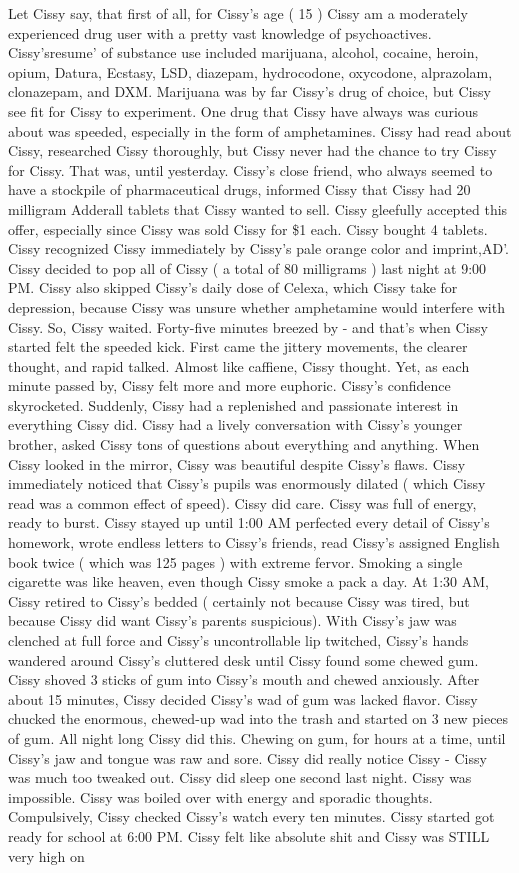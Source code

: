 \documentclass[12pt]{book}
\begin{document}
Let Cissy say, that first of all, for Cissy's age ( 15 ) Cissy am a moderately experienced drug user with a pretty vast knowledge of psychoactives. Cissy'sresume' of substance use included marijuana, alcohol, cocaine, heroin, opium, Datura, Ecstasy, LSD, diazepam, hydrocodone, oxycodone, alprazolam, clonazepam, and DXM. Marijuana was by far Cissy's drug of choice, but Cissy see fit for Cissy to experiment. One drug that Cissy have always was curious about was speeded, especially in the form of amphetamines. Cissy had read about Cissy, researched Cissy thoroughly, but Cissy never had the chance to try Cissy for Cissy. That was, until yesterday. Cissy's close friend, who always seemed to have a stockpile of pharmaceutical drugs, informed Cissy that Cissy had 20 milligram Adderall tablets that Cissy wanted to sell. Cissy gleefully accepted this offer, especially since Cissy was sold Cissy for \$1 each. Cissy bought 4 tablets. Cissy recognized Cissy immediately by Cissy's pale orange color and imprint,AD'. Cissy decided to pop all of Cissy ( a total of 80 milligrams ) last night at 9:00 PM. Cissy also skipped Cissy's daily dose of Celexa, which Cissy take for depression, because Cissy was unsure whether amphetamine would interfere with Cissy. So, Cissy waited. Forty-five minutes breezed by - and that's when Cissy started felt the speeded kick. First came the jittery movements, the clearer thought, and rapid talked. Almost like caffiene, Cissy thought. Yet, as each minute passed by, Cissy felt more and more euphoric. Cissy's confidence skyrocketed. Suddenly, Cissy had a replenished and passionate interest in everything Cissy did. Cissy had a lively conversation with Cissy's younger brother, asked Cissy tons of questions about everything and anything. When Cissy looked in the mirror, Cissy was beautiful despite Cissy's flaws. Cissy immediately noticed that Cissy's pupils was enormously dilated ( which Cissy read was a common effect of speed). Cissy did care. Cissy was full of energy, ready to burst. Cissy stayed up until 1:00 AM perfected every detail of Cissy's homework, wrote endless letters to Cissy's friends, read Cissy's assigned English book twice ( which was 125 pages ) with extreme fervor. Smoking a single cigarette was like heaven, even though Cissy smoke a pack a day. At 1:30 AM, Cissy retired to Cissy's bedded ( certainly not because Cissy was tired, but because Cissy did want Cissy's parents suspicious). With Cissy's jaw was clenched at full force and Cissy's uncontrollable lip twitched, Cissy's hands wandered around Cissy's cluttered desk until Cissy found some chewed gum. Cissy shoved 3 sticks of gum into Cissy's mouth and chewed anxiously. After about 15 minutes, Cissy decided Cissy's wad of gum was lacked flavor. Cissy chucked the enormous, chewed-up wad into the trash and started on 3 new pieces of gum. All night long Cissy did this. Chewing on gum, for hours at a time, until Cissy's jaw and tongue was raw and sore. Cissy did really notice Cissy - Cissy was much too tweaked out. Cissy did sleep one second last night. Cissy was impossible. Cissy was boiled over with energy and sporadic thoughts. Compulsively, Cissy checked Cissy's watch every ten minutes. Cissy started got ready for school at 6:00 PM. Cissy felt like absolute shit and Cissy was STILL very high on 
\end{document}
